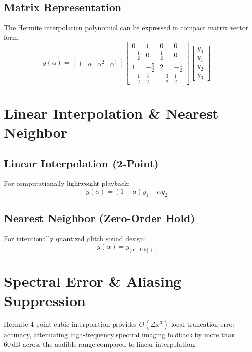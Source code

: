 \documentclass[11pt,a4paper]{article}
\begin{document}
\subsection{Matrix Representation}
The Hermite interpolation polynomial can be expressed in compact matrix vector form:
\begin{equation}
y(\alpha) = \begin{bmatrix} 1 & \alpha & \alpha^2 & \alpha^3 \end{bmatrix}
\begin{bmatrix}
0 & 1 & 0 & 0 \\
-\frac{1}{2} & 0 & \frac{1}{2} & 0 \\
1 & -\frac{5}{2} & 2 & -\frac{1}{2} \\
-\frac{1}{2} & \frac{3}{2} & -\frac{3}{2} & \frac{1}{2}
\end{bmatrix}
\begin{bmatrix}
y_0 \\ y_1 \\ y_2 \\ y_3
\end{bmatrix}
\end{equation}

\section{Linear Interpolation \& Nearest Neighbor}
\subsection{Linear Interpolation (2-Point)}
For computationally lightweight playback:
\begin{equation}
y(\alpha) = (1 - \alpha) y_1 + \alpha y_2
\end{equation}

\subsection{Nearest Neighbor (Zero-Order Hold)}
For intentionally quantized glitch sound design:
\begin{equation}
y(\alpha) = y_{\lfloor \alpha + 0.5 \rfloor + i}
\end{equation}

\section{Spectral Error \& Aliasing Suppression}
Hermite 4-point cubic interpolation provides $O(\Delta x^3)$ local truncation error accuracy, attenuating high-frequency spectral imaging foldback by more than $60\,\text{dB}$ across the audible range compared to linear interpolation.
\end{document}
